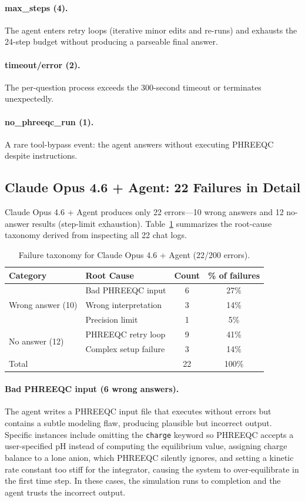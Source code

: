 \documentclass[sigconf,anonymous]{acmart}
\begin{document}
\paragraph{max\_steps (4).}
The agent enters retry loops (iterative minor edits and re-runs) and exhausts the 24-step budget without producing a parseable final answer.

\paragraph{timeout/error (2).}
The per-question process exceeds the 300-second timeout or terminates unexpectedly.

\paragraph{no\_phreeqc\_run (1).}
A rare tool-bypass event: the agent answers without executing PHREEQC despite instructions.

\subsection{Claude Opus 4.6 + Agent: 22 Failures in Detail}
Claude Opus 4.6 + Agent produces only 22 errors---10 wrong answers and 12 no-answer results (step-limit exhaustion). Table~\ref{tab:opus_failures} summarizes the root-cause taxonomy derived from inspecting all 22 chat logs.

\begin{table}[t]
\centering
\small
\begin{tabular}{llcc}
\toprule
Category & Root Cause & Count & \% of failures \\
\midrule
\multirow{3}{*}{Wrong answer (10)} 
  & Bad PHREEQC input & 6 & 27\% \\
  & Wrong interpretation & 3 & 14\% \\
  & Precision limit & 1 & 5\% \\
\midrule
\multirow{2}{*}{No answer (12)} 
  & PHREEQC retry loop & 9 & 41\% \\
  & Complex setup failure & 3 & 14\% \\
\midrule
\multicolumn{2}{l}{Total} & 22 & 100\% \\
\bottomrule
\end{tabular}
\caption{Failure taxonomy for Claude Opus 4.6 + Agent (22/200 errors).}
\label{tab:opus_failures}
\end{table}

\paragraph{Bad PHREEQC input (6 wrong answers).}
The agent writes a PHREEQC input file that executes without errors but contains a subtle modeling flaw, producing plausible but incorrect output. Specific instances include omitting the \texttt{charge} keyword so PHREEQC accepts a user-specified pH instead of computing the equilibrium value, assigning charge balance to a lone anion, which PHREEQC silently ignores, and setting a kinetic rate constant too stiff for the integrator, causing the system to over-equilibrate in the first time step. In these cases, the simulation runs to completion and the agent trusts the incorrect output.
\end{document}
